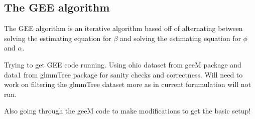 \documentclass[10pt]{article}
\begin{document}
\subsection{The GEE algorithm}

The GEE algorithm is an iterative algorithm based off of  alternating between solving the estimating equation for $\beta$ and solving the estimating equation for $\phi$ and $\alpha$.





Trying to get GEE code running. Using ohio dataset from geeM package and data1 from glmmTree package for sanity checks and correctness. Will need to work on filtering the glmmTree dataset more as in current forumulation will not run.

Also going through the geeM code to make modifications to get the basic setup!










\end{document}
